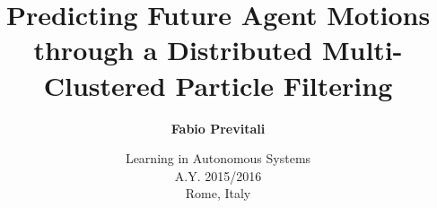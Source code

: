 \documentclass{beamer}
\title[Predicting Future Agent Motions through a Distributed Multi-Clustered PF]{\Large Predicting Future Agent Motions through a Distributed Multi- Clustered Particle Filtering}
\subtitle{}
\author[Fabio Previtali]{\Large\textbf{Fabio Previtali}}
\date[May 9, 2016]{Learning in Autonomous Systems\\A.Y. 2015/2016\\Rome, Italy}
\begin{document}
\begin{frame}[plain]
	\titlepage
\end{frame}











\tiny


\end{document}
